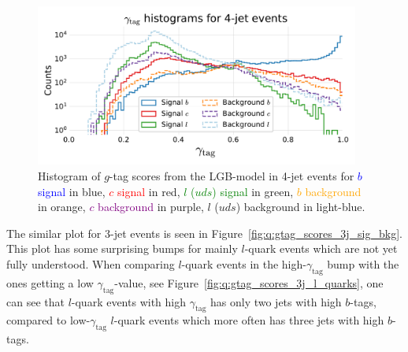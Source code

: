 \begin{figure}[h!]
  \centerfloat
  \includegraphics[width=0.95\textwidth, trim=10 10 10 45, clip]{figures/quarks/gtag-histogram-sigbkg-down_sample=1.00-ML_vars=vertex-selection=b-ejet_min=4-n_iter_RS_lgb=99-n_iter_RS_xgb=9-cdot_cut=0.90-version=19-njet=4.pdf}
  \caption[Distribution of $g$-Tag Scores in 4-Jet Events for Signal and Background]
          {Histogram of $g$-tag scores from the LGB-model in 4-jet events for \textcolor{blue}{$b$ signal} in blue, \textcolor{red}{$c$ signal} in red, \textcolor{green}{$l$ ($uds$) signal} in green, \textcolor{orange}{$b$ background} in orange, \textcolor{purple}{$c$ background} in purple, \textcolor{light-blue}{$l$ ($uds$) background} in light-blue.
          } 
  \label{fig:q:gtag_scores_4j_sig_bkg}
\end{figure}

The similar plot for 3-jet events is seen in Figure~\ref{fig:q:gtag_scores_3j_sig_bkg}. This plot has some surprising bumps for mainly $l$-quark events which are not yet fully understood. When comparing $l$-quark events in the high-$\gamma_\mathrm{tag}$ bump with the ones getting a low $\gamma_\mathrm{tag}$-value, see Figure~\ref{fig:q:gtag_scores_3j_l_quarks}, one can see that $l$-quark events with high $\gamma_\mathrm{tag}$ has only two jets with high $b$-tags, compared to low-$\gamma_\mathrm{tag}$ $l$-quark events which more often has three jets with high $b$-tags. 

